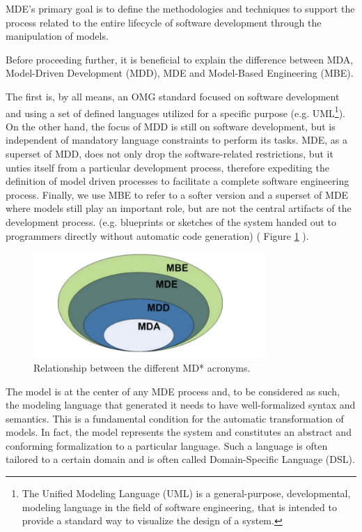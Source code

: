 MDE's primary goal is to define the methodologies and techniques to support the process related to the entire lifecycle of software development through the manipulation of models.

Before proceeding further, it is beneficial to explain the difference between MDA, Model-Driven Development (MDD), MDE and Model-Based Engineering (MBE).

The first is, by all means, an OMG standard focused on software development and using a set of defined languages utilized for a specific purpose (e.g. UML\footnote{The Unified Modeling Language (UML) is a general-purpose, developmental, modeling language in the field of software engineering, that is intended to provide a standard way to visualize the design of a system.}). On the other hand, the focus of MDD is still on software development, but is independent of mandatory language constraints to perform its tasks.
MDE, as a superset of MDD, does not only drop the software-related restrictions, but it unties itself from a particular development process, therefore expediting the definition of model driven processes to facilitate a complete software engineering process. 
Finally, we use MBE to refer to a softer version and a superset of MDE where models still play an important role, but are not the central artifacts of the development process. (e.g. blueprints or sketches of the system handed out to programmers directly without automatic code generation) ( Figure \ref{fig:mda} ).

\vspace{0cm}
\begin{figure}[htbp]
  \centering
    \includegraphics[height=4cm]{images/mda}
  \caption{Relationship between the different MD* acronyms.}
  \label{fig:mda}
\end{figure}
\vspace{0cm}

The model is at the center of any MDE process and, to be considered as such, the modeling language that generated it needs to have well-formalized syntax and semantics. This is a fundamental condition for the automatic transformation of models. In fact, the model represents the system and constitutes an abstract and conforming formalization to a particular language. Such a language is often tailored to a certain domain and is often called Domain-Specific Language (DSL). 

